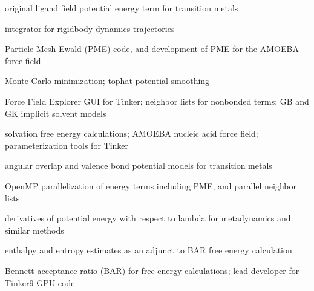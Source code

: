 \documentclass[letterpaper,11pt,english]{sphinxmanual}
\begin{document}
\sphinxAtStartPar
{}

\sphinxAtStartPar
original ligand field potential energy term for transition metals

\sphinxAtStartPar
{}

\sphinxAtStartPar
integrator for rigid\sphinxhyphen{}body dynamics trajectories

\sphinxAtStartPar
{}

\sphinxAtStartPar
Particle Mesh Ewald (PME) code, and development of PME for the AMOEBA force field

\sphinxAtStartPar
{}

\sphinxAtStartPar
Monte Carlo minimization; tophat potential smoothing

\sphinxAtStartPar
{}

\sphinxAtStartPar
Force Field Explorer GUI for Tinker; neighbor lists for nonbonded terms; GB and GK implicit solvent models

\sphinxAtStartPar
{}

\sphinxAtStartPar
solvation free energy calculations; AMOEBA nucleic acid force field; parameterization tools for Tinker

\sphinxAtStartPar
{}

\sphinxAtStartPar
angular overlap and valence bond potential models for transition metals

\sphinxAtStartPar
{}

\sphinxAtStartPar
OpenMP parallelization of energy terms including PME, and parallel neighbor lists

\sphinxAtStartPar
{}

\sphinxAtStartPar
derivatives of potential energy with respect to lambda for metadynamics and similar methods

\sphinxAtStartPar
{}

\sphinxAtStartPar
enthalpy and entropy estimates as an adjunct to BAR free energy calculation

\sphinxAtStartPar
{}

\sphinxAtStartPar
Bennett acceptance ratio (BAR) for free energy calculations; lead developer for Tinker9 GPU code

\sphinxAtStartPar
{}
\end{document}
